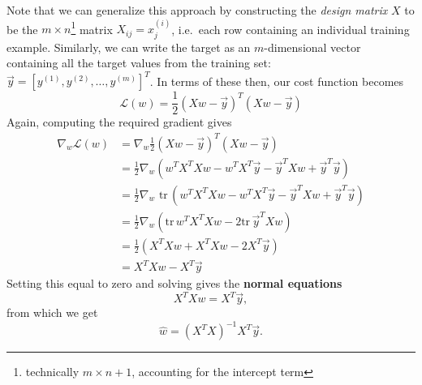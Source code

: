 \documentclass[../main.tex]{subfiles}
\begin{document}
Note that we can generalize this approach by constructing the \emph{design matrix} $X$ to be the $m\times
n$\footnote{technically $m\times n + 1$, accounting for the intercept term} matrix $X_{ij} = x^{(i)}_j$, i.e.\ each row
containing an individual training example.
%
Similarly, we can write the target as an $m$-dimensional vector containing all the target values from the training set:
$\vec{y} = {[y^{(1)}, y^{(2)}, \ldots, y^{(m)}]}^{T}$.
%
In terms of these then, our cost function becomes 
%
\begin{equation}
  \mathcal{L}(w) = \frac{1}{2}{\left(X w - \vec{y}\right)}^{T}{\left(X w - \vec{y}\right)}
\end{equation}
%
Again, computing the required gradient gives
%
\begin{align}
  \nabla_{w} \mathcal{L}(w) 
  &= \nabla_{w}\frac{1}{2}{\left(X w - \vec{y}\right)}^{T}{\left(X w - \vec{y}\right)} \\
  &= \frac{1}{2}\nabla_{w} {\left(w^{T}X^{T}X w - w^{T} X^{T} \vec{y} - \vec{y}^{T} X w + \vec{y}^{T} \vec{y}\right)} \\
  &= \frac{1}{2}\nabla_{w} \,\,\mathrm{tr}\,{\left(w^{T}X^{T} X w - w^{T} X^{T} \vec{y} - \vec{y}^{T} X w +
    \vec{y}^{T}\vec{y}\right)}\\
  &= \frac{1}{2} \nabla_{w} {\left(\mathrm{tr}\,w^{T}X^{T} X w - 2 \mathrm{tr}\,\vec{y}^{T} X w\right)}\\
  &= \frac{1}{2}{\left(X^{T}X w + X^{T} X w - 2 X^{T} \vec{y}\right)}\\
  &= X^{T} X w - X^{T} \vec{y}
\end{align}
%
Setting this equal to zero and solving gives the \textbf{normal equations}
%
\begin{equation}
  X^{T} X w = X^{T} \vec{y},
  \label{eq:normal_equations}
\end{equation}
%
from which we get
%
\begin{equation}
  \hat{w} = {\left(X^{T} X\right)}^{-1} X^{T} \vec{y}.
    \label{eq:linear_regression_solution}
\end{equation} 
\end{document}
